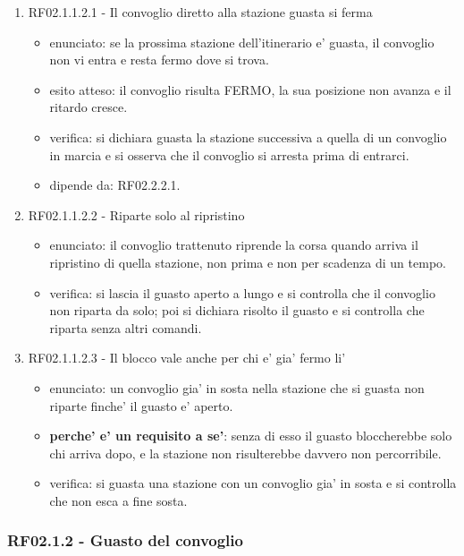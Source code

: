 \documentclass[11pt]{article}
\begin{document}
\begin{enumerate}
\begin{enumerate}
\item RF02.1.1.2.1 - Il convoglio diretto alla stazione guasta si ferma
\label{sec:org504e489}
\begin{itemize}
\item enunciato: se la prossima stazione dell'itinerario e' guasta, il convoglio non vi entra e resta
fermo dove si trova.
\item esito atteso: il convoglio risulta FERMO, la sua posizione non avanza e il ritardo cresce.
\item verifica: si dichiara guasta la stazione successiva a quella di un convoglio in marcia e si osserva
che il convoglio si arresta prima di entrarci.
\item dipende da: RF02.2.2.1.
\end{itemize}
\item RF02.1.1.2.2 - Riparte solo al ripristino
\label{sec:orge266649}
\begin{itemize}
\item enunciato: il convoglio trattenuto riprende la corsa quando arriva il ripristino di quella
stazione, non prima e non per scadenza di un tempo.
\item verifica: si lascia il guasto aperto a lungo e si controlla che il convoglio non riparta da solo;
poi si dichiara risolto il guasto e si controlla che riparta senza altri comandi.
\end{itemize}
\item RF02.1.1.2.3 - Il blocco vale anche per chi e' gia' fermo li'
\label{sec:org6e55f0c}
\begin{itemize}
\item enunciato: un convoglio gia' in sosta nella stazione che si guasta non riparte finche' il guasto e'
aperto.
\item \textbf{perche' e' un requisito a se'}: senza di esso il guasto bloccherebbe solo chi arriva dopo, e la
stazione non risulterebbe davvero non percorribile.
\item verifica: si guasta una stazione con un convoglio gia' in sosta e si controlla che non esca a fine
sosta.
\end{itemize}
\end{enumerate}
\end{enumerate}
\subsubsection{RF02.1.2 - Guasto del convoglio}
\label{sec:org7cb654d}
\end{document}
